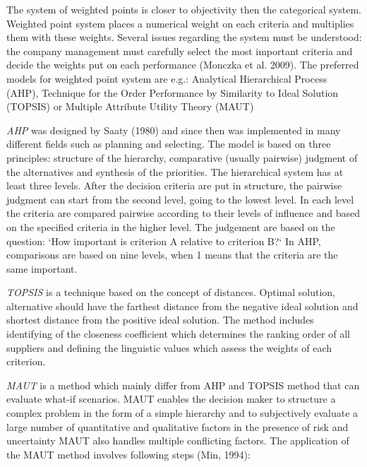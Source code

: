 \documentclass[oneside,12pt]{article}%
\begin{document}
The system of weighted points is closer to objectivity then the categorical system. Weighted point system places a numerical weight on each criteria and multiplies them with these weights. Several issues regarding the system must be understood: the company management must carefully select the most important criteria and decide the weights put on each performance (Monczka et al. 2009). The preferred models for weighted point system are e.g.: Analytical Hierarchical Process (AHP), Technique for the Order Performance by Similarity to Ideal Solution (TOPSIS) or Multiple Attribute Utility Theory (MAUT) \par
\emph{AHP} was designed by Saaty (1980) and since then was implemented in many different fields such as planning and selecting. The model is based on three principles: structure of the hierarchy, comparative (usually pairwise) judgment of the alternatives and synthesis of the priorities. The hierarchical system has at least three levels. After the decision criteria are put in structure, the pairwise judgment can start from the second level, going to the lowest level. In each level the criteria are compared pairwise according to their levels of influence and based on the specified criteria in the higher level. The judgement are based on the question: ‘How important is criterion A relative to criterion B?‘ In AHP, comparisons are based on nine levels, when 1 means that the criteria are the same important. \par
\emph{TOPSIS} is a technique based on the concept of distances. Optimal solution, alternative should have the farthest distance from the negative ideal solution and shortest distance from the positive ideal solution. The method includes identifying of the closeness coefficient which determines the ranking order of all suppliers and defining the linguistic values which assess the weights of each criterion. \par
\emph{MAUT} is a method which mainly differ from AHP and TOPSIS method that can evaluate what-if scenarios. MAUT enables the decision maker to structure a complex problem in the form of a simple hierarchy and to subjectively evaluate a large number of quantitative and qualitative factors in the presence of risk and uncertainty MAUT also handles multiple conflicting factors. The application of the MAUT method involves following steps (Min, 1994):
\end{document}
